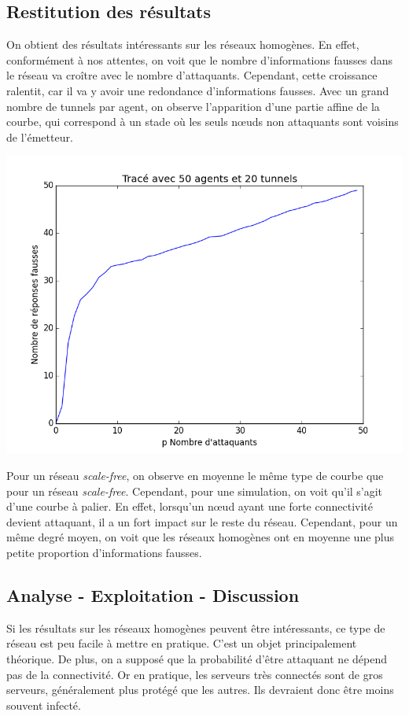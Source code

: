\documentclass[11pt,a4paper]{article}
\begin{document}
	
\subsection{Restitution des résultats}
	On obtient des résultats intéressants sur les réseaux homogènes. En effet, conformément à nos attentes, on voit que le nombre d'informations fausses dans le réseau va croître avec le nombre d'attaquants. Cependant, cette croissance ralentit, car il va y avoir une redondance d'informations fausses. Avec un grand nombre de tunnels par agent, on observe l'apparition d'une partie affine de la courbe, qui correspond à un stade où les seuls nœuds non attaquants sont voisins de l'émetteur.
	
\includegraphics[scale=0.3]{../resultats/atkaleat/atkaleat-50-20-1.png} 
	
	Pour un réseau \emph{scale-free}, on observe en moyenne le même type de courbe que pour un réseau \emph{scale-free}. Cependant, pour une simulation, on voit qu'il s'agit d'une courbe à palier. En effet, lorsqu'un nœud ayant une forte connectivité devient attaquant, il a un fort impact sur le reste du réseau.
	Cependant, pour un même degré moyen, on voit que les réseaux homogènes ont en moyenne une plus petite proportion d'informations fausses. 


\subsection{Analyse - Exploitation - Discussion}
	Si les résultats sur les réseaux homogènes peuvent être intéressants, ce type de réseau est peu facile à mettre en pratique. C'est un objet principalement théorique. De plus, on a supposé que la probabilité d'être attaquant ne dépend pas de la connectivité. Or en pratique, les serveurs très connectés sont de gros serveurs, généralement plus protégé que les autres. Ils devraient donc être moins souvent infecté.
\end{document}
